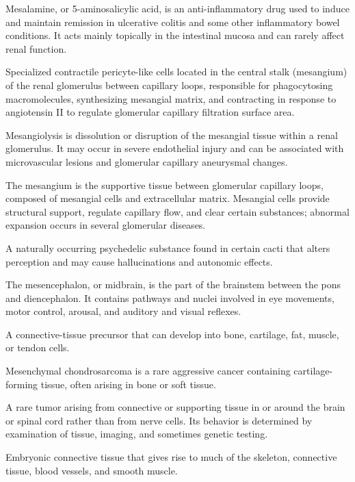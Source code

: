  Mesalamine, or 5-aminosalicylic acid, is an anti-inflammatory drug used to induce and maintain remission in ulcerative colitis and some other inflammatory bowel conditions. It acts mainly topically in the intestinal mucosa and can rarely affect renal function.

 Specialized contractile pericyte-like cells located in the central stalk (mesangium) of the renal glomerulus between capillary loops, responsible for phagocytosing macromolecules, synthesizing mesangial matrix, and contracting in response to angiotensin II to regulate glomerular capillary filtration surface area.

 Mesangiolysis is dissolution or disruption of the mesangial tissue within a renal glomerulus. It may occur in severe endothelial injury and can be associated with microvascular lesions and glomerular capillary aneurysmal changes.

 The mesangium is the supportive tissue between glomerular capillary loops, composed of mesangial cells and extracellular matrix. Mesangial cells provide structural support, regulate capillary flow, and clear certain substances; abnormal expansion occurs in several glomerular diseases.

 A naturally occurring psychedelic substance found in certain cacti that alters perception and may cause hallucinations and autonomic effects.

 The mesencephalon, or midbrain, is the part of the brainstem between the pons and diencephalon. It contains pathways and nuclei involved in eye movements, motor control, arousal, and auditory and visual reflexes.

 A connective-tissue precursor that can develop into bone, cartilage, fat, muscle, or tendon cells.

 Mesenchymal chondrosarcoma is a rare aggressive cancer containing cartilage-forming tissue, often arising in bone or soft tissue.

 A rare tumor arising from connective or supporting tissue in or around the brain or spinal cord rather than from nerve cells. Its behavior is determined by examination of tissue, imaging, and sometimes genetic testing.

 Embryonic connective tissue that gives rise to much of the skeleton, connective tissue, blood vessels, and smooth muscle.

